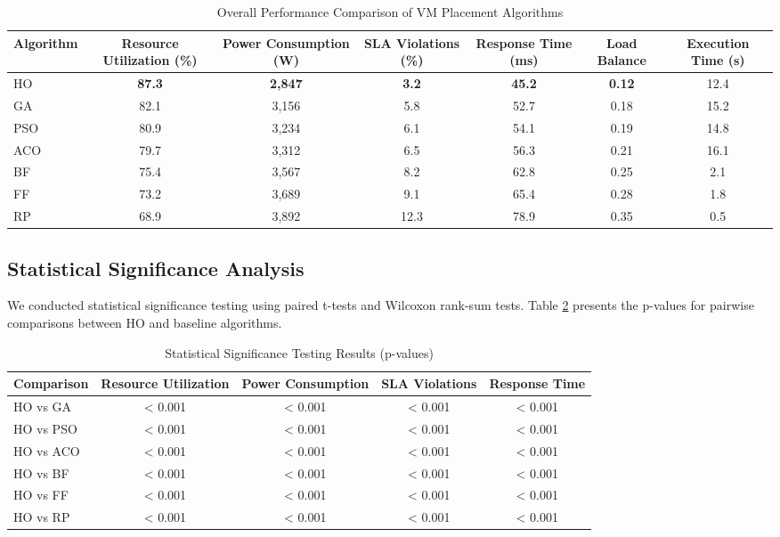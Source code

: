 \documentclass[conference]{IEEEtran}
\begin{document}
\begin{table}[htbp]
\caption{Overall Performance Comparison of VM Placement Algorithms}
\label{tab:overall_performance}
\centering
\begin{tabular}{lcccccc}
\toprule
\textbf{Algorithm} & \textbf{Resource Utilization (\%)} & \textbf{Power Consumption (W)} & \textbf{SLA Violations (\%)} & \textbf{Response Time (ms)} & \textbf{Load Balance} & \textbf{Execution Time (s)} \\
\midrule
HO & \textbf{87.3} & \textbf{2,847} & \textbf{3.2} & \textbf{45.2} & \textbf{0.12} & 12.4 \\
GA & 82.1 & 3,156 & 5.8 & 52.7 & 0.18 & 15.2 \\
PSO & 80.9 & 3,234 & 6.1 & 54.1 & 0.19 & 14.8 \\
ACO & 79.7 & 3,312 & 6.5 & 56.3 & 0.21 & 16.1 \\
BF & 75.4 & 3,567 & 8.2 & 62.8 & 0.25 & 2.1 \\
FF & 73.2 & 3,689 & 9.1 & 65.4 & 0.28 & 1.8 \\
RP & 68.9 & 3,892 & 12.3 & 78.9 & 0.35 & 0.5 \\
\bottomrule
\end{tabular}
\end{table}

\subsection{Statistical Significance Analysis}

We conducted statistical significance testing using paired t-tests and Wilcoxon rank-sum tests. Table \ref{tab:statistical_tests} presents the p-values for pairwise comparisons between HO and baseline algorithms.

\begin{table}[htbp]
\caption{Statistical Significance Testing Results (p-values)}
\label{tab:statistical_tests}
\centering
\begin{tabular}{lcccc}
\toprule
\textbf{Comparison} & \textbf{Resource Utilization} & \textbf{Power Consumption} & \textbf{SLA Violations} & \textbf{Response Time} \\
\midrule
HO vs GA & < 0.001 & < 0.001 & < 0.001 & < 0.001 \\
HO vs PSO & < 0.001 & < 0.001 & < 0.001 & < 0.001 \\
HO vs ACO & < 0.001 & < 0.001 & < 0.001 & < 0.001 \\
HO vs BF & < 0.001 & < 0.001 & < 0.001 & < 0.001 \\
HO vs FF & < 0.001 & < 0.001 & < 0.001 & < 0.001 \\
HO vs RP & < 0.001 & < 0.001 & < 0.001 & < 0.001 \\
\bottomrule
\end{tabular}
\end{table}
\end{document}
